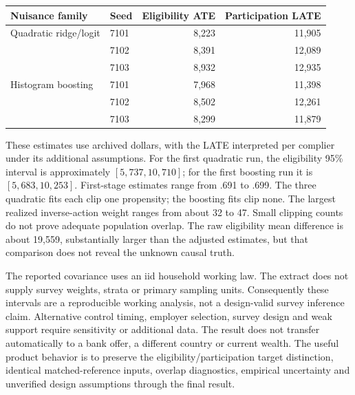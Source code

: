 \begin{center}\small
\begin{tabular}{llrr}\toprule
Nuisance family&Seed&Eligibility ATE&Participation LATE\\\midrule
Quadratic ridge/logit&7101&8,223&11,905\\
&7102&8,391&12,089\\
&7103&8,932&12,935\\
Histogram boosting&7101&7,968&11,398\\
&7102&8,502&12,261\\
&7103&8,299&11,879\\\bottomrule
\end{tabular}\end{center}
These estimates use archived dollars, with the LATE interpreted per
complier under its additional assumptions. For the first quadratic run,
the eligibility 95\% interval is approximately $[5,737,10,710]$; for the
first boosting run it is $[5,683,10,253]$. First-stage estimates range from
.691 to .699. The three quadratic fits each clip one propensity; the
boosting fits clip none. The largest realized inverse-action weight ranges
from about 32 to 47. Small clipping counts do not prove adequate population
overlap. The raw eligibility mean difference is about 19,559, substantially
larger than the adjusted estimates, but that comparison does not reveal the
unknown causal truth.

The reported covariance uses an iid household working law. The extract does
not supply survey weights, strata or primary sampling units. Consequently
these intervals are a reproducible working analysis, not a design-valid
survey inference claim. Alternative control timing, employer selection,
survey design and weak support require sensitivity or additional data.
The result does not transfer automatically to a bank offer, a different
country or current wealth. The useful product behavior is to preserve the
eligibility/participation target distinction, identical matched-reference
inputs, overlap diagnostics, empirical uncertainty and unverified design
assumptions through the final result.
